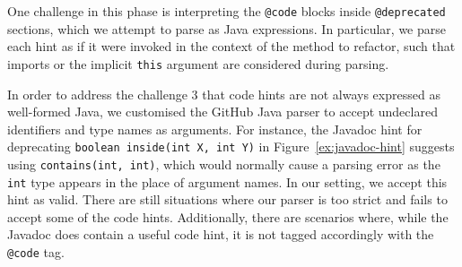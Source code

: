 \documentclass[conference]{IEEEtran}
\begin{document}

One challenge in this phase is interpreting the
\lstinline[breaklines=true]{@code} blocks inside \lstinline[breaklines=true]{@deprecated} sections, which 
we attempt to parse as Java expressions. In particular, we parse each hint as if it were invoked in the context of
the method to refactor, such that imports or the implicit \lstinline[breaklines=true]{this} argument
are considered during parsing.

%
In order to address the challenge 3 that code hints are not always expressed as well-formed Java,
we customised the
GitHub Java parser
to accept undeclared identifiers and type names
as arguments. For instance, the Javadoc hint for deprecating \lstinline[breaklines=true]{boolean inside(int X, int Y)}
in Figure~\ref{ex:javadoc-hint} suggests using
\lstinline[breaklines=true]{contains(int, int)}, which would normally cause a parsing error as the \lstinline[breaklines=true]{int} type
appears in the place of argument names. In our setting, we accept this hint as valid.
There are still situations where our parser is too strict and fails to accept
some of the code hints. Additionally, there are scenarios where, while the Javadoc
does contain a useful code hint, it is not tagged accordingly with
the \lstinline[breaklines=true]{@code} tag. %

 
\end{document}
